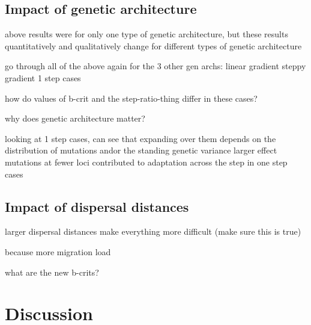 \subsection{Impact of genetic architecture}

above results were for only one type of genetic architecture, but these results quantitatively and qualitatively change for different types of genetic architecture

go through all of the above again for the 3 other gen archs:
	linear gradient
	steppy gradient
	1 step cases

how do values of b-crit and the step-ratio-thing differ in these cases?


why does genetic architecture matter?

	looking at 1 step cases, can see that expanding over them depends on the distribution of mutations and\/or the standing genetic variance
	larger effect mutations at fewer loci contributed to adaptation across the step in one step cases
	
\subsection{Impact of dispersal distances}

larger dispersal distances make everything more difficult (make sure this is true)

because more migration load

what are the new b-crits?


\section{Discussion}





